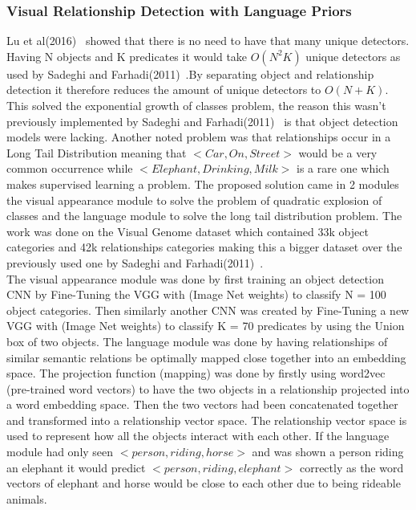 \documentclass{csfyp}
\newcommand\tab[1][1cm]{\hspace*{#1}}
\begin{document}
\subsubsection{Visual Relationship Detection with Language Priors}
Lu et al(2016)~\cite{lu2016visual} showed that there is no need to have that many unique detectors. Having N objects and K \Gls{predicate}s it would take $O(N^2 K)$ unique detectors as used by Sadeghi and Farhadi(2011)~\cite{VisualPhrases}.By separating object and relationship detection it therefore reduces the amount of unique detectors to $O(N+K)$. This solved the exponential growth of classes problem, the reason this wasn't previously implemented by Sadeghi and Farhadi(2011)~\cite{VisualPhrases} is that object detection models were lacking. Another noted problem was that relationships occur in a Long Tail Distribution meaning that $<Car,On,Street>$ would be a very common occurrence while $<Elephant, Drinking , Milk>$ is a rare one which makes supervised learning a problem. The proposed solution came in 2 modules the visual appearance module to solve the problem of quadratic explosion of classes and the language module to solve the long tail distribution problem. The work was done on the Visual Genome dataset which contained 33k object categories and 42k relationships  categories making this a bigger dataset over the previously used one by Sadeghi and Farhadi(2011)~\cite{VisualPhrases}.
\\
\tab
The visual appearance module was done by first training an object detection CNN by Fine-Tuning the VGG with (Image Net weights) to classify N = 100 object categories. Then similarly another CNN was created by Fine-Tuning a new VGG with (Image Net weights) to classify K = 70 \Gls{predicate}s by using the Union box of two objects. The language module was done by having relationships of similar semantic relations be optimally mapped close together into an embedding space. The projection function (mapping) was done by firstly using word2vec (pre-trained word vectors) to have the two objects in a relationship projected into a word embedding space. Then the two vectors had been concatenated together and transformed into a relationship vector space. The relationship vector space is used to represent how all the objects interact with each other. If the language module had only seen $<person , riding , horse>$ and was shown a person riding an elephant it would predict $<person , riding , elephant>$ correctly as the word vectors of elephant and horse would be close to each other due to being rideable animals.
\end{document}
